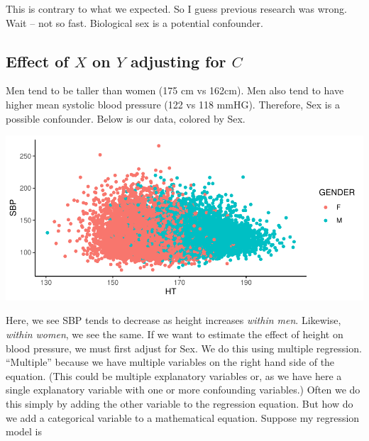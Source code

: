 \documentclass[]{book}
\newenvironment{Shaded}{\begin{snugshade}}{\end{snugshade}}
\newcommand{\DataTypeTok}[1]{\textcolor[rgb]{0.13,0.29,0.53}{#1}}
\newcommand{\KeywordTok}[1]{\textcolor[rgb]{0.13,0.29,0.53}{\textbf{#1}}}
\newcommand{\NormalTok}[1]{#1}
\newcommand{\OperatorTok}[1]{\textcolor[rgb]{0.81,0.36,0.00}{\textbf{#1}}}
\newcommand{\StringTok}[1]{\textcolor[rgb]{0.31,0.60,0.02}{#1}}
\begin{document}
This is contrary to what we expected. So I guess previous research was wrong. Wait -- not so fast. Biological sex is a potential confounder.

\hypertarget{effect-of-x-on-y-adjusting-for-c}{%
\subsection{\texorpdfstring{Effect of \(X\) on \(Y\) adjusting for \(C\)}{Effect of X on Y adjusting for C}}\label{effect-of-x-on-y-adjusting-for-c}}

Men tend to be taller than women (175 cm vs 162cm). Men also tend to have higher mean systolic blood pressure (122 vs 118 mmHG). Therefore, Sex is a possible confounder. Below is our data, colored by Sex.

\begin{Shaded}
\end{Shaded}

\includegraphics{MA206supplement_files/figure-latex/unnamed-chunk-5-1.pdf}

Here, we see SBP tends to decrease as height increases \emph{within men}. Likewise, \emph{within women}, we see the same. If we want to estimate the effect of height on blood pressure, we must first adjust for Sex. We do this using multiple regression. ``Multiple'' because we have multiple variables on the right hand side of the equation. (This could be multiple explanatory variables or, as we have here a single explanatory variable with one or more confounding variables.) Often we do this simply by adding the other variable to the regression equation. But how do we add a categorical variable to a mathematical equation. Suppose my regression model is
\end{document}
